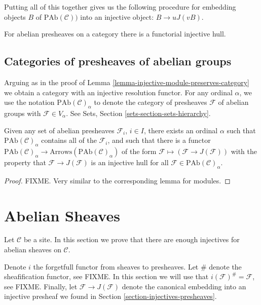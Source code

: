 \smallskip\noindent
Putting all of this together gives us the following procedure
for embedding objects $B$ of $\text{PAb}(\mathcal{C}))$ into
an injective object: $B \to uJ(vB)$.

\begin{proposition}
\label{proposition-presheaves-injectives}
For abelian presheaves on a category there is a functorial injective hull.
\end{proposition}

\subsection{Categories of presheaves of abelian groups}
\label{subsection-category-presheaves}

\noindent
Arguing as in the proof of
Lemma \ref{lemma-injective-module-preserves-category} we obtain a category
with an injective resolution functor. For any ordinal $\alpha$,
we use the notation $\text{PAb}(\mathcal{C})_\alpha$ to denote the category
of presheaves $\mathcal{F}$ of abelian groups with $\mathcal{F} \in V_\alpha$.
See Sets, Section \ref{sets-section-sets-hierarchy}.

\begin{lemma} 
\label{lemma-injective-presheaf-preserves-category}
Given any set of abelian presheaves $\mathcal{F}_i$, $i\in I$, there
exists an ordinal $\alpha$ such that $\text{PAb}(\mathcal{C})_\alpha$
contains all of the $\mathcal{F}_i$, and such that there is a functor
$\text{PAb}(\mathcal{C})_\alpha \to
\text{Arrows}(\text{PAb}(\mathcal{C})_\alpha)$
of the form $\mathcal{F} \mapsto (\mathcal{F} \to J(\mathcal{F}))$
with the property that $\mathcal{F} \to J(\mathcal{F})$ is an injective
hull for all $\mathcal{F} \in \text{PAb}(\mathcal{C})_\alpha$.
\end{lemma}

\begin{proof}
FIXME. Very similar to the corresponding lemma for modules.
\end{proof}

\section{Abelian Sheaves}
\label{section-injectives-sheaves}

\noindent
Let $\mathcal{C}$ be a site. In this section we prove that there are 
enough injectives for abelian sheaves on $\mathcal{C}$. 

\smallskip\noindent
Denote $i$ the forgetfull functor from sheaves to presheaves. Let
$\#$ denote the sheafification functor, see FIXME. In this section we
will use that $i(\mathcal{F})^\# = \mathcal{F}$, see FIXME.
Finally, let $\mathcal{F} \to J(\mathcal{F})$ denote the canonical
embedding into an injective presheaf we found in 
Section \ref{section-injectives-presheaves}. 

